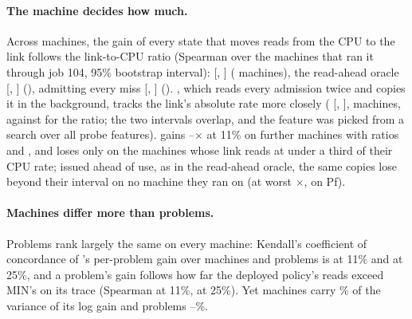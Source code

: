 \paragraph{The machine decides how much.} Across machines, the gain of every state that moves reads from the CPU to
the link follows the link-to-CPU ratio (Spearman over the machines that ran it through job 104, 95\% bootstrap
interval): \MinOne{} \rcFetchRatio{} [\rcFetchRatioLo, \rcFetchRatioHi] (\rcFetchRatioN{} machines), the read-ahead
oracle \rcPacedRatio{} [\rcPacedRatioLo, \rcPacedRatioHi] (\rcPacedRatioN), admitting every miss \rcAaRatio{}
[\rcAaRatioLo, \rcAaRatioHi] (\rcAaRatioN). \MinTwo, which reads every admission twice and copies it in
the background, tracks the link's absolute rate more closely (\rcBypassBp{} [\rcBypassBpLo, \rcBypassBpHi],
\rcBypassBpN{} machines, against \rcBypassRatio{} for the ratio; the two intervals overlap, and the feature was picked
from a search over all probe features). \MinOne{} gains
\jeNewFetchLowMin--\jeNewFetchLowMax$\times$ at 11\% on \jeNewN{} further machines with ratios \jeNewRatioMin{} and
\jeNewRatioMax{}, and loses only on the machines whose link reads at under a third of their CPU rate; issued ahead of use,
as in the read-ahead oracle, the same copies lose beyond their interval on no machine they ran on (at worst \jbPfPaced$\times$, on Pf).

\paragraph{Machines differ more than problems.} Problems rank largely the same on every machine: Kendall's coefficient
of concordance of \MinOne's per-problem gain over \ppMachines{} machines and \ppProblems{} problems is
\ppWFetchLow{} at 11\% and \ppWFetchMid{} at 25\%, and a problem's gain follows how far the deployed policy's reads
exceed MIN's on its trace (Spearman \ppRhoFetchLow{} at 11\%, \ppRhoFetchMid{} at 25\%). Yet machines carry
\ppVarHostsFetchMax\% of the variance of its log gain and problems \ppVarProbFetchMin--\ppVarProbFetchMax\%.
